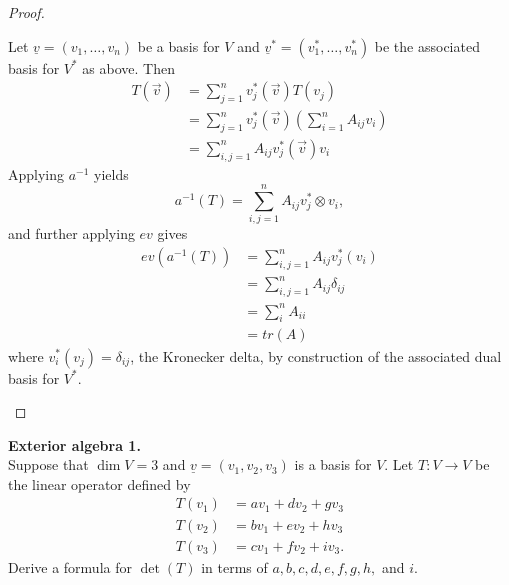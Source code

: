 \documentclass{article}
\newenvironment{problem}[2][Problem]{\begin{trivlist}
\item[\hskip \labelsep {\bfseries #1}\hskip \labelsep {\bfseries #2.}]}{\end{trivlist}}
\begin{document}
\begin{proof}
\begin{enumerate}[(a)]
    Let $\underline{v} = (v_1, \hdots, v_n)$ be a basis for $V$ and
    $\underline{v}^* = (v^*_1, \hdots, v^*_n)$ be the associated basis for $V^*$
    as above.
    Then \begin{align*}
      T(\vec{v}) &= \sum_{j=1}^n v^*_j(\vec{v})T(v_j) \\
      &= \sum_{j=1}^n v^*_j(\vec{v})\left(
        \sum_{i=1}^n A_{ij}v_i
      \right)\\
      &= \sum_{i,j=1}^n A_{ij} v_j^*(\vec{v})v_i
    \end{align*}
    Applying $a^{-1}$ yields \[
      a^{-1}(T) = \sum_{i,j=1}^n A_{ij} v_j^* \otimes v_i,
    \] and further applying $ev$ gives \begin{align*}
      ev(a^{-1}(T))
        &= \sum_{i,j=1}^n A_{ij} v_j^*(v_i)\\
        &= \sum_{i,j=1}^n A_{ij} \delta_{ij}\\
        &= \sum_i^n A_{ii}\\
        &= tr(A)
    \end{align*} where $v_i^*(v_j) = \delta_{ij}$, the Kronecker delta, by
    construction of the associated dual basis for $V^*$.
  \end{enumerate}
\end{proof}

\pagebreak

\begin{problem}{2} \textbf{Exterior algebra 1.}\\
  Suppose that $\dim V = 3$ and $\underline{v} = (v_1, v_2, v_3)$ is a
  basis for $V$. Let $T\colon V \rightarrow V$ be the linear operator
  defined by \begin{align*}
    T(v_1) &= av_1 + dv_2 + gv_3\\
    T(v_2) &= bv_1 + ev_2 + hv_3\\
    T(v_3) &= cv_1 + fv_2 + iv_3.
  \end{align*}
  Derive a formula for $\det(T)$ in terms of $a,b,c,d,e,f,g,h,$ and $i$.
\end{problem}
\end{document}
